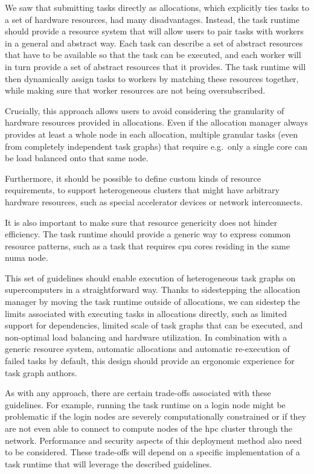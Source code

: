 \begin{description}[wide=0pt]
		We saw that submitting tasks directly as allocations, which explicitly ties tasks to a set of
		hardware resources, had many disadvantages. Instead, the task runtime should provide a resource
		system that will allow users to pair tasks with workers in a general and abstract way. Each task
		can describe a set of abstract resources that have to be available so that the task can be
		executed, and each worker will in turn provide a set of abstract resources that it provides. The
		task runtime will then dynamically assign tasks to workers by matching these resources together,
		while making sure that worker resources are not being oversubscribed.

		Crucially, this approach allows users to avoid considering the granularity of hardware resources
		provided in allocations. Even if the allocation manager always provides at least a whole node in
		each allocation, multiple granular tasks (even from completely independent task graphs) that
		require e.g.\ only a single core can be load balanced onto that same node.

		Furthermore, it should be possible to define custom kinds of resource requirements, to support
		heterogeneous clusters that might have arbitrary hardware resources, such as special accelerator
		devices or network interconnects.

		It is also important to make sure that resource genericity does not hinder efficiency. The task
		runtime should provide a generic way to express common resource patterns, such as a task that
		requires \gls{cpu} cores residing in the same \gls{numa} node.
\end{description}

This set of guidelines should enable execution of heterogeneous task graphs on supercomputers in a
straightforward way. Thanks to sidestepping the allocation manager by moving the task runtime
outside of allocations, we can sidestep the limits associated with executing tasks in allocations
directly, such as limited support for dependencies, limited scale of task graphs that can be
executed, and non-optimal load balancing and hardware utilization. In combination with a generic
resource system, automatic allocations and automatic re-execution of failed tasks by default, this
design should provide an ergonomic experience for task graph authors.

As with any approach, there are certain trade-offs associated with these guidelines. For
example, running the task runtime on a login node might be problematic if the login nodes are
severely computationally constrained or if they are not even able to connect to compute nodes of
the \gls{hpc} cluster through the network. Performance and security aspects of this
deployment method also need to be considered. These trade-offs will depend on a specific implementation of a task runtime that will leverage the described guidelines.

